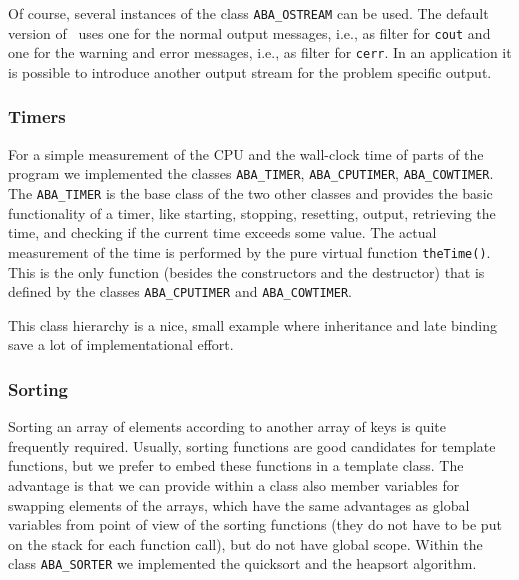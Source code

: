 Of course, several instances of the class {\tt ABA\_OSTREAM} can be
used. The default version of \ABACUS\ uses one for the normal output
messages, i.e., as filter for {\tt cout}
and one for the warning and error messages, i.e., as filter for {\tt cerr}. 
In an application
it is possible to introduce another output stream for the problem
specific output.

\subsubsection{Timers}
\noindent
For a simple measurement of the CPU and the wall-clock time of parts of the program we
implemented the classes {\tt ABA\_TIMER}, 
{\tt ABA\_CPUTIMER}, {\tt ABA\_COWTIMER}.
The {\tt ABA\_TIMER} is the base class of the two other classes and
provides the basic functionality of a timer, like starting, stopping,
resetting, output, retrieving the time, and checking if the current time
exceeds some value.
The actual measurement of the time is performed by the pure virtual 
function {\tt theTime()}. 
This is the only function (besides the constructors and
the destructor) that is defined by the classes {\tt ABA\_CPUTIMER} and
{\tt ABA\_COWTIMER}.

This class hierarchy is a nice, small example where inheritance and 
late binding save a lot of implementational effort.

\subsubsection{Sorting}
\noindent
Sorting an array of elements according to another array of keys is
quite frequently required. Usually, sorting functions are good
candidates for template functions, but we prefer to embed these
functions in a template class. The advantage is that we can provide
within a class also member variables for swapping elements of the
arrays, which have the same advantages as global variables from
point of view of the sorting functions (they do not have to be put
on the stack for each function call), but do not have global scope.
Within the class {\tt ABA\_SORTER} we 
implemented the quicksort and the heapsort
algorithm.
